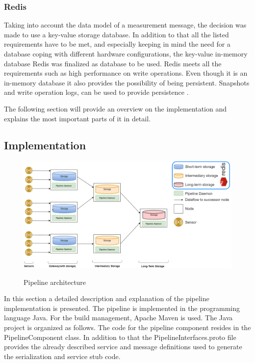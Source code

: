\subsubsection{Redis}
Taking into account the data model of a measurement message, the decision was made to use a key-value storage database. In addition to that all the listed requirements have to be met, and especially keeping in mind the need for a database coping with different hardware configurations, the key-value in-memory database Redis was finalized as database to be used.
Redis meets all the requirements such as high performance on write operations. Even though it is an in-memory database it also provides the possibility of being persistent. Snapshots and write operation logs, can be used to provide persistence \cite{redis}. 

The following section will provide an overview on the implementation and explains the most important parts of it in detail.
\subsection{Implementation} \label{pipeline_implementation}

\begin{figure}[h]
\centering
\includegraphics[width=\linewidth]{figures/pipelinearchitecture.png}\\
\caption{Pipeline architecture}
\label{pipeline_arch}
\end{figure}
In this section a detailed description and explanation of the pipeline implementation is presented. The pipeline is implemented in the programming language Java. For the build management, Apache Maven is used. The Java project is organized as follows. The code for the pipeline component resides in the PipelineComponent class. In addition to that the PipelineInterfaces.proto file provides the already described service and message definitions used to generate the serialization and service stub code. 

